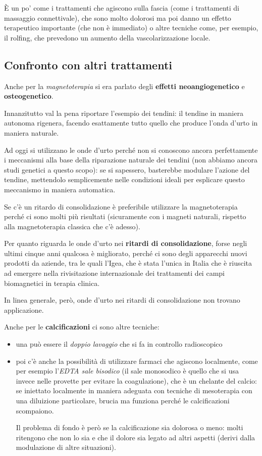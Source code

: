 È un po' come i trattamenti che agiscono sulla fascia (come i
trattamenti di massaggio connettivale), che sono molto dolorosi ma poi
danno un effetto terapeutico importante (che non è immediato) o altre
tecniche come, per esempio, il rolfing, che prevedono un aumento della
vascolarizzazione locale.

\subsection{Confronto con altri trattamenti}

Anche per la \emph{magnetoterapia} si era parlato degli \textbf{effetti
neoangiogenetico} e \textbf{osteogenetico}.

Innanzitutto val la pena riportare l'esempio dei tendini: il tendine in
maniera autonoma rigenera, facendo esattamente tutto quello che produce
l'onda d'urto in maniera naturale.

Ad oggi si utilizzano le onde d'urto perché non si conoscono ancora
perfettamente i meccanismi alla base della riparazione naturale dei
tendini (non abbiamo ancora studi genetici a questo scopo): se si
sapessero, basterebbe modulare l'azione del tendine, mettendolo
semplicemente nelle condizioni ideali per esplicare questo meccanismo in
maniera automatica.

Se c'è un ritardo di consolidazione è preferibile utilizzare la
magnetoterapia perché ci sono molti più risultati (sicuramente con i
magneti naturali, rispetto alla magnetoterapia classica che c'è adesso).

Per quanto riguarda le onde d'urto nei \textbf{ritardi di
consolidazione}, forse negli ultimi cinque anni qualcosa è migliorato,
perché ci sono degli apparecchi nuovi prodotti da aziende, tra le quali
l'Igea, che è stata l'unica in Italia che è riuscita ad emergere nella
rivisitazione internazionale dei trattamenti dei campi biomagnetici in
terapia clinica.

In linea generale, però, onde d'urto nei ritardi di consolidazione non
trovano applicazione.

Anche per le \textbf{calcificazioni} ci sono altre tecniche:

\begin{itemize}
\item
  una può essere il \emph{doppio lavaggio} che si fa in controllo
  radioscopico
\item
  poi c'è anche la possibilità di utilizzare farmaci che agiscono
  localmente, come per esempio l'\emph{EDTA sale bisodico} (il sale
  monosodico è quello che si usa invece nelle provette per evitare la
  coagulazione), che è un chelante del calcio: se iniettato localmente
  in maniera adeguata con tecniche di mesoterapia con una diluizione
  particolare, brucia ma funziona perché le calcificazioni scompaiono.

Il problema di fondo è però se la calcificazione sia dolorosa o meno:
molti ritengono che non lo sia e che il dolore sia legato ad altri
aspetti (derivi dalla modulazione di altre situazioni).
\end{itemize}

